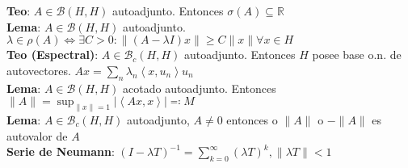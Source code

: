 \documentclass[9pt, letterpaper]{extarticle}
\newcommand{\R}{\mathbb{R}}
\newcommand{\inn}[1]{\left\langle #1\right\rangle}
\begin{document}
\begin{multicols*}{2}
\textbf{Teo}: $A\in\mathcal{B}(H,H)$ autoadjunto. Entonces $\sigma(A)\subseteq \R$\\
\textbf{Lema}: $A\in\mathcal{B}(H,H)$ autoadjunto. $\lambda\in\rho(A)\iff \exists C>0:\|(A-\lambda I)x\|\geq C\|x\|\forall x\in H$\\
\textbf{\color{red}Teo (Espectral)}: $A\in\mathcal{B}_c(H,H)$ autoadjunto. Entonces $H$ posee base o.n. de autovectores. $Ax=\sum_n \lambda_n\inn{x,u_n}u_n$\\
\textbf{Lema}: $A\in\mathcal{B}(H,H)$ acotado autoadjunto. Entonces $\|A\|=\sup_{\|x\|=1}|\inn{Ax,x}|\eqqcolon M$\\
\textbf{Lema}: $A\in\mathcal{B}_c(H,H)$ autoadjunto, $A\neq 0$ entonces o $\|A\|$ o $-\|A\|$ es autovalor de $A$\\
\textbf{Serie de Neumann}: $(I-\lambda T)^{-1}=\sum_{k=0}^\infty (\lambda T)^k, \|\lambda T\|<1$

\end{multicols*}
\end{document}
